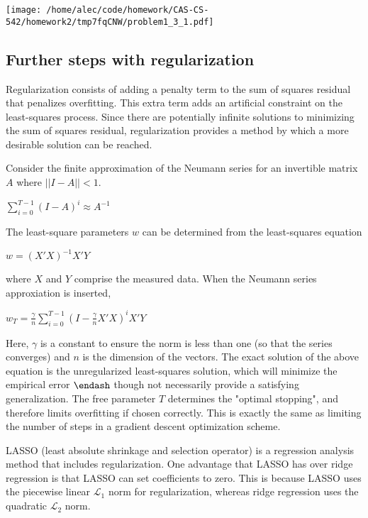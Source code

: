 \documentclass[12pt,a4paper]{article}
\begin{document}
\texttt{[image: /home/alec/code/homework/CAS-CS-542/homework2/tmp7fqCNW/problem1\_3\_1.pdf]}

\subsection{Further steps with regularization}
Regularization consists of adding a penalty term to the sum of squares residual that penalizes overfitting. This extra term adds an artificial constraint on the least-squares process. Since there are potentially infinite solutions to minimizing the sum of squares residual, regularization provides a method by which a more desirable solution can be reached.


Consider the finite approximation of the Neumann series for an invertible matrix $A$ where $||I - A|| < 1$.

$\sum_{i=0}^{T-1} (I - A)^i \approx A^{-1}$

The least-square parameters $w$ can be determined from the least-squares equation

$w = (X'X)^{-1}X'Y$

where $X$ and $Y$ comprise the measured data. When the Neumann series approxiation is inserted,

$w_T = \frac{\gamma}{n} \sum_{i=0}^{T-1} (I - \frac{\gamma}{n}X'X)^i X'Y$

Here, $\gamma$ is a constant to ensure the norm is less than one (so that the series converges) and $n$ is the dimension of the vectors. The exact solution of the above equation is the unregularized least-squares solution, which will minimize the empirical error \ensuremath{\endash} though not necessarily provide a satisfying generalization. The free parameter $T$ determines the "optimal stopping", and therefore limits overfitting if chosen correctly. This is exactly the same as limiting the number of steps in a gradient descent optimization scheme.


LASSO (least absolute shrinkage and selection operator) is a regression analysis method that includes regularization. One advantage that LASSO has over ridge regression is that LASSO can set coefficients to zero. This is because LASSO uses the piecewise linear $\mathcal{L}_1$ norm for regularization, whereas ridge regression uses the quadratic $\mathcal{L}_2$ norm.
\end{document}
